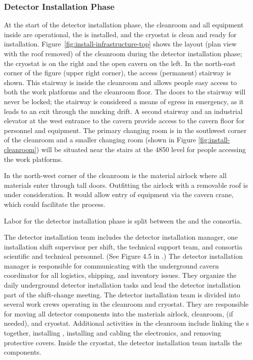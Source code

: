 \subsubsection{Detector Installation Phase}
\label{sec:fdsp-tc-inst-execute}



At the start of the detector installation phase, the cleanroom and all equipment inside are operational, the  is installed, and the cryostat is clean and ready for installation. 
Figure~\ref{fig:install-infrastructure-top} shows the layout (plan view with the roof removed) of the cleanroom during the detector installation phase; the cryostat is on the right and the open cavern on the left. 
In the north-east corner of the figure (upper right corner), the access  (permanent) stairway is shown. 
This stairway is inside the cleanroom and allows people easy access to both the work platforms and the cleanroom floor. 
The doors to the stairway will never be locked; the stairway is considered a means of egress in emergency, as it leads to an exit through the mucking drift.
A second stairway and an industrial elevator at the west entrance to the cavern provide access to the cavern floor for personnel and equipment. 
The primary changing room is in the southwest corner of the cleanroom and a smaller changing room (shown in Figure \ref{fig:install-cleanroom}) will be situated near the stairs at the 4850 level for people accessing the work platforms.

In the north-west corner of the cleanroom is the material airlock where all materials enter  through tall doors. 
Outfitting the airlock with a removable roof is under consideration. 
It would allow entry of equipment via the cavern crane, which could facilitate the process.
 
Labor for the detector installation phase is split between the  and the  consortia. 

The  detector installation team includes the  detector installation manager, one installation shift supervisor per shift, the  technical support team, and  consortia scientific and technical personnel. (See Figure 4.5 in \tcchjpo{}.) The detector installation manager is responsible for communicating with the underground cavern
coordinator for all logistics, shipping, and inventory issues. They organize the daily underground detector installation tasks and lead the detector installation part of the shift-change meeting. The detector installation team is divided into several work crews operating in the cleanroom and cryostat. They are responsible for moving all detector components into the materials airlock, cleanroom, \coldbox  (if needed), and cryostat. Additional activities in the cleanroom include linking the s together, installing , installing and cabling the electronics, and removing   protective covers. Inside the cryostat, the detector installation team installs the   components. 

